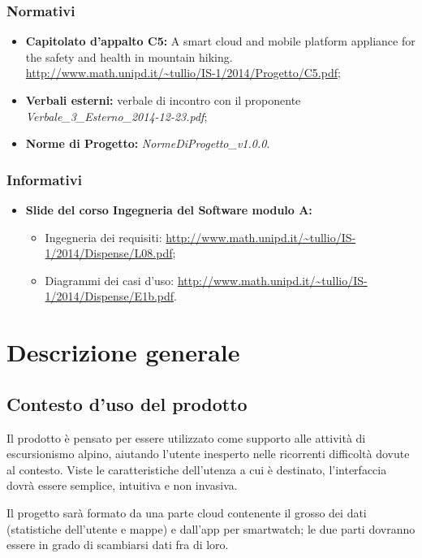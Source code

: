 \subsubsection{Normativi}
\begin{itemize}
\item \textbf{Capitolato d'appalto C5:} \CAPITOLATO{} A smart cloud and mobile platform appliance for the safety and health in mountain hiking. \\
\url{http://www.math.unipd.it/~tullio/IS-1/2014/Progetto/C5.pdf};
\item \textbf{Verbali esterni:} verbale di incontro con il proponente {\itshape Verbale\_3\_Esterno\_2014-12-23.pdf}; 
\item \textbf{Norme di Progetto:} {\itshape NormeDiProgetto\_v1.0.0}.
\end{itemize} 

\subsubsection{Informativi}
\begin{itemize}
\item \textbf{Slide del corso Ingegneria del Software modulo A:}
\begin{itemize}
\item Ingegneria dei requisiti: \url{http://www.math.unipd.it/~tullio/IS-1/2014/Dispense/L08.pdf};
\item Diagrammi dei casi d'uso: \url{http://www.math.unipd.it/~tullio/IS-1/2014/Dispense/E1b.pdf}.
\end{itemize}
\end{itemize}

\clearpage
\section{Descrizione generale}
\subsection{Contesto d'uso del prodotto}
Il prodotto è pensato per essere utilizzato come supporto alle attività di escursionismo alpino, aiutando l'utente inesperto nelle ricorrenti difficoltà dovute al contesto. Viste le caratteristiche dell'utenza a cui è destinato, l'interfaccia dovrà essere semplice, intuitiva e non invasiva.

Il progetto sarà formato da una parte cloud contenente il grosso dei dati (statistiche dell'utente e mappe) e dall'app per smartwatch; le due parti dovranno essere in grado di scambiarsi dati fra di loro. 


